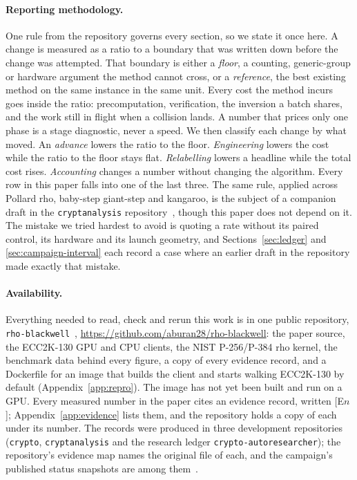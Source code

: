 \paragraph{Reporting methodology.} One rule from the repository
governs every section, so we state it once here. A change is measured
as a ratio to a boundary that was written down before the change was
attempted. That boundary is either a \emph{floor}, a counting,
generic-group or hardware argument the method cannot cross, or a
\emph{reference}, the best existing method on the same instance in the
same unit. Every cost the method incurs goes inside the ratio:
precomputation, verification, the inversion a batch shares, and the
work still in flight when a collision lands. A number that prices only
one phase is a stage diagnostic, never a speed. We then classify each
change by what moved. An \emph{advance} lowers the ratio to the floor.
\emph{Engineering} lowers the cost while the ratio to the floor stays
flat. \emph{Relabelling} lowers a headline while the total cost rises.
\emph{Accounting} changes a number without changing the algorithm.
Every row in this paper falls into one of the last three. The same
rule, applied across Pollard rho, baby-step giant-step and kangaroo,
is the subject of a companion draft in the
\texttt{cryptanalysis} repository~\cite{ecdlppaper}, though this paper does not depend
on it. The mistake we tried hardest to avoid is quoting a rate without
its paired control, its hardware and its launch geometry, and
Sections~\ref{sec:ledger} and \ref{sec:campaign-interval} each record
a case where an earlier draft in the repository made exactly that
mistake.

\paragraph{Availability.} Everything needed to read, check and rerun
this work is in one public repository, \texttt{rho-blackwell}~\cite{rhoblackwell},
\url{https://github.com/aburan28/rho-blackwell}: the paper source, the ECC2K-130 GPU and CPU clients, the
NIST P-256/P-384 rho kernel, the benchmark data behind every figure, a
copy of every evidence record, and a Dockerfile for an image that builds
the client and starts walking ECC2K-130 by default
(Appendix~\ref{app:repro}). The image has not yet been built and run on
a GPU. Every measured number in the paper cites an evidence record,
written [E$n$]; Appendix~\ref{app:evidence} lists them, and the
repository holds a copy of each under its number. The records were
produced in three development repositories (\texttt{crypto},
\texttt{cryptanalysis} and the research ledger
\texttt{crypto-autoresearcher}); the repository's evidence map names the
original file of each, and the campaign's published status snapshots are
among them~.

